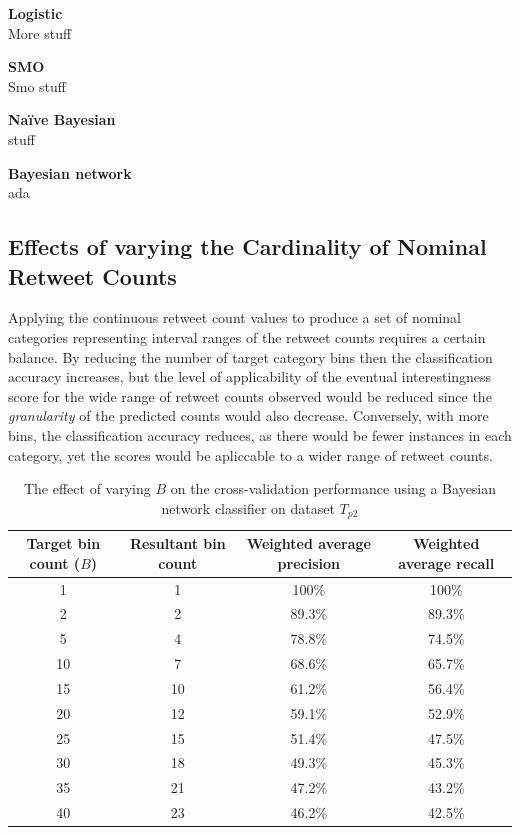 \textbf{Logistic}\\
More stuff

\textbf{SMO}\\
Smo stuff

\textbf{Na\"{i}ve Bayesian}\\
stuff

\textbf{Bayesian network}\\
ada


\subsection{Effects of varying the Cardinality of Nominal Retweet Counts}
\label{section:effects_of_varying_bin_sizes}
Applying the continuous retweet count values to produce a set of nominal categories representing interval ranges of the retweet counts requires a certain balance. By reducing the number of target category bins then the classification accuracy increases, but the level of applicability of the eventual interestingness score for the wide range of retweet counts observed would be reduced since the \textit{granularity} of the predicted counts would also decrease. Conversely, with more bins, the classification accuracy reduces, as there would be fewer instances in each category, yet the scores would be apliccable to a wider range of retweet counts.

\begin{table}[h]\footnotesize
\begin{center}
\begin{tabular}{ c | c | c | c }
	Target bin count ($B$)	& Resultant bin count & Weighted average precision &  Weighted average recall \\
	\hline
	\hline 
    1 & 1 & 100\% & 100\% \\
    2 & 2 & 89.3\% & 89.3\% \\
    5 & 4 & 78.8\%  & 74.5\% \\
    10 & 7 & 68.6\% & 65.7\% \\
    15 & 10 & 61.2\% & 56.4\% \\
    20 & 12 & 59.1\% & 52.9\% \\
    25 & 15 & 51.4\% & 47.5\% \\
    30 & 18 & 49.3\% & 45.3\% \\
    35 & 21 & 47.2\% & 43.2\% \\
    40 & 23 & 46.2\% & 42.5\% \\
    \hline  
\end{tabular}
\end{center}
\caption{The effect of varying $B$ on the cross-validation performance using a Bayesian network classifier on dataset $T_{p2}$}
\label{table:binperformance}
\end{table}

